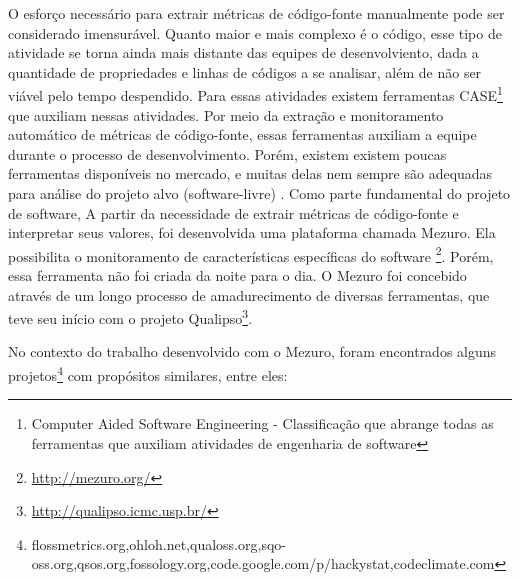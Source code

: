 O esforço necessário para extrair métricas de código-fonte manualmente pode ser considerado imensurável. Quanto maior e mais complexo é o código, esse tipo de atividade se torna ainda mais distante das equipes de desenvolviento, dada a quantidade de propriedades e linhas de códigos a se analisar, além de não ser viável pelo tempo despendido. Para essas atividades existem ferramentas CASE\footnote{Computer Aided Software Engineering - Classificação que abrange todas as ferramentas que auxiliam atividades de engenharia de software } que auxiliam nessas atividades. Por meio da extração e monitoramento automático de métricas de código-fonte, essas ferramentas auxiliam  a equipe durante o processo de desenvolvimento. Porém, existem existem poucas ferramentas disponíveis no mercado, e muitas delas nem sempre são adequadas para análise do projeto alvo (software-livre) \cite{meirelles2010mezuro}.
Como parte fundamental do projeto de software,
A partir da necessidade de extrair métricas de código-fonte e interpretar seus valores, foi desenvolvida uma plataforma chamada Mezuro. Ela possibilita o monitoramento de características específicas do software \footnote{\url{http://mezuro.org/}}. Porém, essa ferramenta não foi criada da noite para o dia. O Mezuro foi concebido através de um longo processo de amadurecimento de diversas ferramentas, que teve seu início com o projeto Qualipso\footnote{\url{http://qualipso.icmc.usp.br/}}.

No contexto do trabalho desenvolvido com o Mezuro, foram encontrados alguns projetos\footnote{flossmetrics.org,ohloh.net,qualoss.org,sqo-oss.org,qsos.org,fossology.org,code.google.com/p/hackystat,codeclimate.com} com propósitos similares\cite{meirelles2010mezuro}, entre eles:

